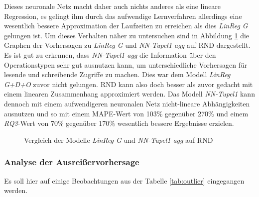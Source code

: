 \documentclass[
	twoside,
	12pt,
	a4paper,
	BCOR10mm,
	DIV14,
	listof=totoc,
	bibliography=totoc,
	headsepline
]{scrreprt}
\begin{document}
Dieses neuronale Netz macht daher auch nichts anderes als eine lineare Regression, es gelingt ihm durch das aufwendige Lernverfahren allerdings eine wesentlich bessere Approximation der Laufzeiten zu erreichen als dies \textit{LinReg G} gelungen ist.
Um dieses Verhalten näher zu untersuchen sind in Abbildung \ref{fig:lin_vergleich} die Graphen der Vorhersagen zu \textit{LinReg G} und \textit{NN-Tupel1 agg} auf RND dargestellt.
Es ist gut zu erkennen, dass \textit{NN-Tupel1 agg} die Information über den Operationstypen sehr gut ausnutzen kann, um unterschiedliche Vorhersagen für lesende und schreibende Zugriffe zu machen.
Dies war dem Modell \textit{LinReg G+D+O} zuvor nicht gelungen.
RND kann also doch besser als zuvor gedacht mit einem linearen Zusammenhang approximiert werden.
Das Modell \textit{NN-Tupel1} kann dennoch mit einem aufwendigeren neuronalen Netz nicht-lineare Abhängigkeiten ausnutzen und so mit einem MAPE-Wert von 103\% gegenüber 270\% und einem \textit{RQ3}-Wert von 70\% gegenüber 170\% wesentlich bessere Ergebnisse erzielen.
\begin{figure}
	\centering
	\hfill
	\caption{Vergleich der Modelle \textit{LinReg G} und \textit{NN-Tupel1 agg} auf RND}
	\label{fig:lin_vergleich}
\end{figure} 

\subsubsection{Analyse der Ausreißervorhersage}
Es soll hier auf einige Beobachtungen aus der Tabelle \ref{tab:outlier} eingegangen werden.
\end{document}
